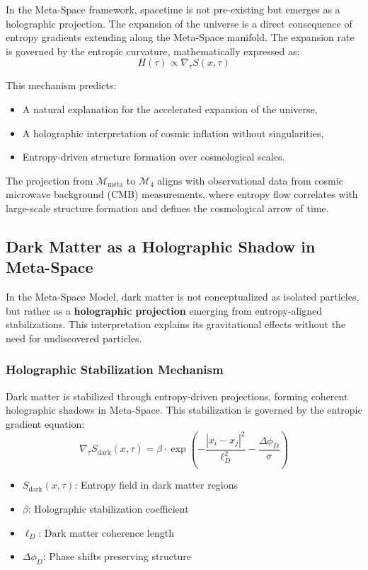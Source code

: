\documentclass[10.5pt,a4paper]{article}
\begin{document}
In the Meta-Space framework, spacetime is not pre-existing but emerges as a holographic projection. The expansion of the universe is a direct consequence of entropy gradients extending along the Meta-Space manifold. The expansion rate is governed by the entropic curvature, mathematically expressed as:
\[
H(\tau) \propto \nabla_\tau S(x, \tau)
\]

This mechanism predicts:
\begin{itemize}
    \item A natural explanation for the accelerated expansion of the universe,
    \item A holographic interpretation of cosmic inflation without singularities,
    \item Entropy-driven structure formation over cosmological scales.
\end{itemize}

The projection from \(\mathcal{M}_{\text{meta}}\) to \(\mathcal{M}_4\) aligns with observational data from cosmic microwave background (CMB) measurements, where entropy flow correlates with large-scale structure formation and defines the cosmological arrow of time.

\subsection{Dark Matter as a Holographic Shadow in Meta-Space}

In the Meta-Space Model, dark matter is not conceptualized as isolated particles, but rather as a \textbf{holographic projection} emerging from entropy-aligned stabilizations. This interpretation explains its gravitational effects without the need for undiscovered particles.

\subsubsection{Holographic Stabilization Mechanism}

Dark matter is stabilized through entropy-driven projections, forming coherent holographic shadows in Meta-Space. This stabilization is governed by the entropic gradient equation:
\[
\nabla_\tau S_{\text{dark}}(x, \tau) = \beta \cdot \exp\left(-\frac{|x_i - x_j|^2}{\ell_D^2} - \frac{\Delta \phi_D}{\sigma}\right)
\]

\begin{itemize}
    \item \(S_{\text{dark}}(x, \tau)\): Entropy field in dark matter regions
    \item \(\beta\): Holographic stabilization coefficient
    \item \(\ell_D\): Dark matter coherence length
    \item \(\Delta \phi_D\): Phase shifts preserving structure
\end{itemize}
\end{document}
